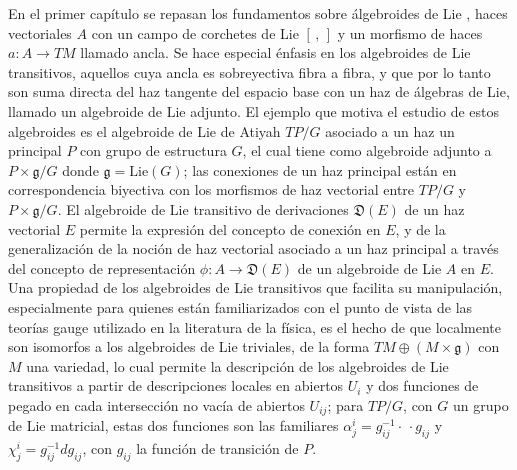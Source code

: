 \documentclass{article}
\begin{document}
En el primer capítulo se repasan los fundamentos sobre álgebroides de Lie
, haces vectoriales $A$ con un campo de corchetes de Lie $[\,,\,]$ y un morfismo de haces $a:A \to TM$ llamado ancla. Se hace especial énfasis en los algebroides de Lie transitivos, aquellos cuya ancla es sobreyectiva fibra a fibra, y que por lo tanto son suma directa del haz tangente del espacio base con un haz de álgebras de Lie, llamado un algebroide de Lie adjunto. El ejemplo que motiva el estudio de estos algebroides es el algebroide de Lie de Atiyah $TP/G$ asociado a un haz un principal $P$ con grupo de estructura $G$, el cual tiene como algebroide adjunto a $P \times \mathfrak g/G$ donde $\mathfrak g = \text{Lie}(G)$; las conexiones de un haz principal están en correspondencia biyectiva con los morfismos de haz vectorial entre $TP/G$ y $P \times \mathfrak g/G$. El algebroide de Lie transitivo de derivaciones $\mathfrak D(E)$ de un haz vectorial $E$ permite la expresión del concepto de conexión en $E$, y de la generalización de la noción de haz vectorial asociado a un haz principal a través del concepto de representación $\phi: A \to \mathfrak D(E)$ de un algebroide de Lie $A$ en $E$. Una propiedad de los algebroides de Lie transitivos que facilita su manipulación, especialmente para quienes están familiarizados con el punto de vista de las teorías gauge utilizado en la literatura de la física, es el hecho de que localmente son isomorfos a los algebroides de Lie triviales, de la forma $TM\oplus (M \times \mathfrak g)$ con $M$ una variedad, lo cual permite la descripción de los algebroides de Lie transitivos a partir de descripciones locales en abiertos $U_i$ y dos funciones de pegado en cada intersección no vacía de abiertos $U_{ij}$; para $TP/G$, con $G$ un grupo de Lie matricial, estas dos funciones son las familiares $\alpha^i_j = g^{-1}_{ij}\cdot \, \cdot g_{ij}$ y $\chi^i_j = g_{ij}^{-1} dg_{ij}$, con $g_{ij}$ la función de transición de $P$.
\end{document}
